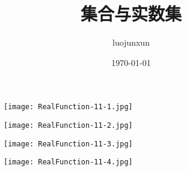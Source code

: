 \documentclass[12pt, a4paper, oneside]{ctexart}
\title{\huge\textbf{集合与实数集}}
\author{luojunxun}
\date{\today}
\begin{document}
\begin{figure}[p]
    \centerline{\texttt{[image: RealFunction-11-1.jpg]}}
\end{figure}

\begin{figure}[p]
    \centerline{\texttt{[image: RealFunction-11-2.jpg]}}
\end{figure}

\begin{figure}[p]
    \centerline{\texttt{[image: RealFunction-11-3.jpg]}}
\end{figure}

\begin{figure}[p]
    \centerline{\texttt{[image: RealFunction-11-4.jpg]}}
\end{figure}
\end{document}
